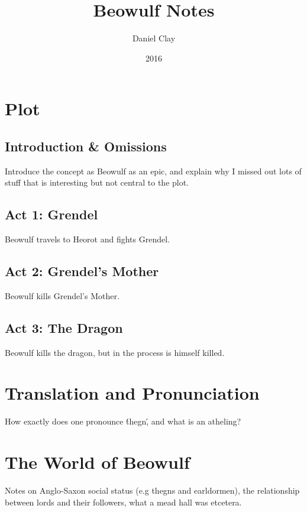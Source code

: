 \documentclass[a4paper]{article}
\begin{document}
\title{Beowulf Notes}
\date{2016}
\author{
Daniel Clay \\ 
}
\maketitle

\section{Plot}

\subsection{Introduction \& Omissions}%

Introduce the concept as Beowulf as an epic, and explain why I missed out lots of
stuff that is interesting but not central to the plot. 

\subsection{Act 1: Grendel}%

Beowulf travels to Heorot and fights Grendel.

\subsection{Act 2: Grendel's Mother}%

Beowulf kills Grendel's Mother.

\subsection{Act 3: The Dragon}%

Beowulf kills the dragon, but in the process is himself killed.

\section{Translation and Pronunciation}

How exactly does one pronounce \'thegn\', and what is an atheling? 

\section{The World of Beowulf}

Notes on Anglo-Saxon social status (e.g thegns and earldormen), the relationship
between lords and their followers, what a mead hall was etcetera.
\end{document}
